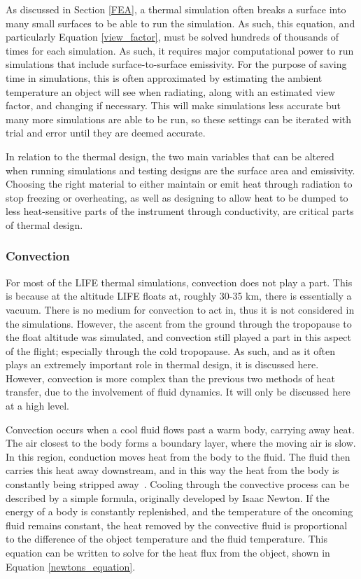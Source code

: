 As discussed in Section \ref{FEA}, a thermal simulation often breaks a surface into many small surfaces to be able to run the simulation. As such, this equation, and particularly Equation \ref{view_factor}, must be solved hundreds of thousands of times for each simulation. As such, it requires major computational power to run simulations that include surface-to-surface emissivity. For the purpose of saving time in simulations, this is often approximated by estimating the ambient temperature an object will see when radiating, along with an estimated view factor, and changing if necessary. This will make simulations less accurate but many more simulations are able to be run, so these settings can be iterated with trial and error until they are deemed accurate.

 In relation to the thermal design, the two main variables that can be altered when running simulations and testing designs are the surface area and emissivity. Choosing the right material to either maintain or emit heat through radiation to stop freezing or overheating, as well as designing to allow heat to be dumped to less heat-sensitive parts of the instrument through conductivity, are critical parts of thermal design.

\subsubsection{Convection}\label{convection_sec}
For most of the LIFE thermal simulations, convection does not play a part. This is because at the altitude LIFE floats at, roughly 30-35 km, there is essentially a vacuum. There is no medium for convection to act in, thus it is not considered in the simulations. However, the ascent from the ground through the tropopause to the float altitude was simulated, and convection still played a part in this aspect of the flight; especially through the cold tropopause. As such, and as it often plays an extremely important role in thermal design, it is discussed here. However, convection is more complex than the previous two methods of heat transfer, due to the involvement of fluid dynamics. It will only be discussed here at a high level.

Convection occurs when a cool fluid flows past a warm body, carrying away heat. The air closest to the body forms a boundary layer, where the moving air is slow. In this region, conduction moves heat from the body to the fluid. The fluid then carries this heat away downstream, and in this way the heat from the body is constantly being stripped away~\citep{heat_transfer_textbook}. Cooling through the convective process can be described by a simple formula, originally developed by Isaac Newton. If the energy of a body is constantly replenished, and the temperature of the oncoming fluid remains constant, the heat removed by the convective fluid is proportional to the difference of the object temperature and the fluid temperature. This equation can be written to solve for the heat flux from the object, shown in Equation \ref{newtons_equation}.

